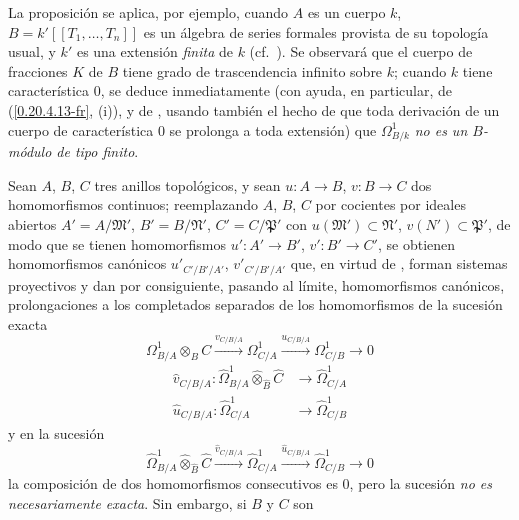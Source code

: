 \begin{env}[20.7.16]
\label{0.20.7.16-fr}
La proposición  se aplica, por ejemplo, cuando $A$ es un
cuerpo $k$, $B=k'[[T_1,\ldots,T_n]]$ es un álgebra de series formales provista de
su topología usual, y $k'$ es una extensión \emph{finita} de $k$ (cf.\
). Se observará que el cuerpo de fracciones $K$ de $B$ tiene
grado de trascendencia infinito sobre $k$; cuando $k$ tiene característica
$0$, se deduce inmediatamente (con ayuda, en particular, de
(\ref{0.20.4.13-fr}, (i)), y de , usando también el hecho de
que toda derivación de un cuerpo de característica $0$ se prolonga a toda
extensión) que $\Omega^1_{B/k}$ \emph{no es un $B$-módulo de tipo finito}.
\end{env}

\begin{env}[20.7.17]
\label{0.20.7.17-fr}
Sean $A$, $B$, $C$ tres anillos topológicos, y sean $u:A\to B$, $v:B\to C$
dos homomorfismos continuos; reemplazando $A$, $B$, $C$ por cocientes por
ideales abiertos $A'=A/\mathfrak{M}'$, $B'=B/\mathfrak{N}'$,
$C'=C/\mathfrak{P}'$ con $u(\mathfrak{M}')\subset\mathfrak{N}'$,
$v(N')\subset\mathfrak{P}'$, de modo que se tienen homomorfismos
$u':A'\to B'$, $v':B'\to C'$, se obtienen homomorfismos canónicos
$u'_{C'/B'/A'}$, $v'_{C'/B'/A'}$ que, en virtud de
, forman sistemas proyectivos y dan por consiguiente,
pasando al límite, homomorfismos canónicos, prolongaciones a los completados
separados de los homomorfismos de la sucesión exacta
\[
  \Omega^1_{B/A}\otimes_B C\xrightarrow{v_{C/B/A}}\Omega^1_{C/A}
  \xrightarrow{u_{C/B/A}}\Omega^1_{C/B}\to0
\]
\begin{align}
  \widehat v_{C/B/A}:\widehat{\Omega}^1_{B/A}
  \widehat\otimes_{\widehat B}\widehat C&\to\widehat{\Omega}^1_{C/A}
  \tag{20.7.17.1}\label{0.20.7.17.1-fr}\\
  \widehat u_{C/B/A}:\widehat{\Omega}^1_{C/A}&\to
  \widehat{\Omega}^1_{C/B} \tag{20.7.17.2}\label{0.20.7.17.2-fr}
\end{align}
y en la sucesión
\begin{equation}
\tag{20.7.17.3}
\label{0.20.7.17.3-fr}
  \widehat{\Omega}^1_{B/A}\widehat\otimes_{\widehat B}\widehat C
  \xrightarrow{\widehat v_{C/B/A}}\widehat{\Omega}^1_{C/A}
  \xrightarrow{\widehat u_{C/B/A}}\widehat{\Omega}^1_{C/B}\to0
\end{equation}
la composición de dos homomorfismos consecutivos es $0$, pero la sucesión
\emph{no es necesariamente exacta}. Sin embargo, si $B$ y $C$ son

\end{env}
